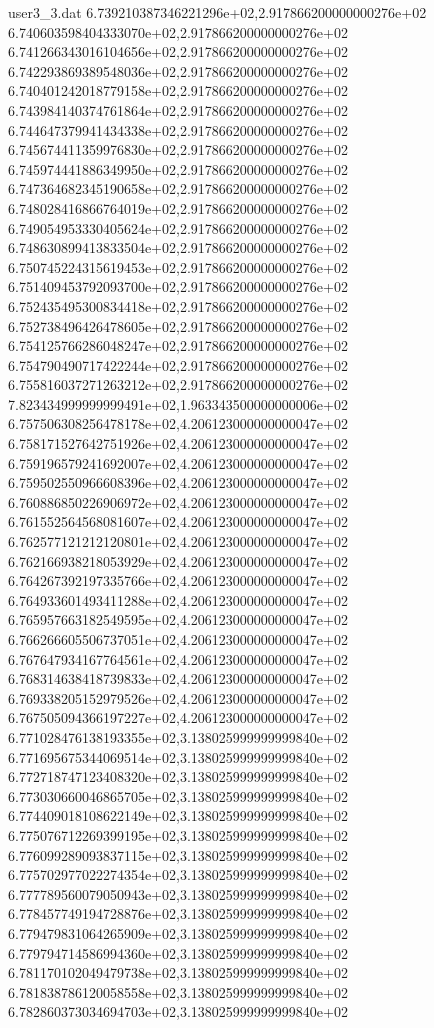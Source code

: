 \begin{filecontents}{user3_3.dat}
6.739210387346221296e+02,2.917866200000000276e+02
6.740603598404333070e+02,2.917866200000000276e+02
6.741266343016104656e+02,2.917866200000000276e+02
6.742293869389548036e+02,2.917866200000000276e+02
6.740401242018779158e+02,2.917866200000000276e+02
6.743984140374761864e+02,2.917866200000000276e+02
6.744647379941434338e+02,2.917866200000000276e+02
6.745674411359976830e+02,2.917866200000000276e+02
6.745974441886349950e+02,2.917866200000000276e+02
6.747364682345190658e+02,2.917866200000000276e+02
6.748028416866764019e+02,2.917866200000000276e+02
6.749054953330405624e+02,2.917866200000000276e+02
6.748630899413833504e+02,2.917866200000000276e+02
6.750745224315619453e+02,2.917866200000000276e+02
6.751409453792093700e+02,2.917866200000000276e+02
6.752435495300834418e+02,2.917866200000000276e+02
6.752738496426478605e+02,2.917866200000000276e+02
6.754125766286048247e+02,2.917866200000000276e+02
6.754790490717422244e+02,2.917866200000000276e+02
6.755816037271263212e+02,2.917866200000000276e+02
7.823434999999999491e+02,1.963343500000000006e+02
6.757506308256478178e+02,4.206123000000000047e+02
6.758171527642751926e+02,4.206123000000000047e+02
6.759196579241692007e+02,4.206123000000000047e+02
6.759502550966608396e+02,4.206123000000000047e+02
6.760886850226906972e+02,4.206123000000000047e+02
6.761552564568081607e+02,4.206123000000000047e+02
6.762577121212120801e+02,4.206123000000000047e+02
6.762166938218053929e+02,4.206123000000000047e+02
6.764267392197335766e+02,4.206123000000000047e+02
6.764933601493411288e+02,4.206123000000000047e+02
6.765957663182549595e+02,4.206123000000000047e+02
6.766266605506737051e+02,4.206123000000000047e+02
6.767647934167764561e+02,4.206123000000000047e+02
6.768314638418739833e+02,4.206123000000000047e+02
6.769338205152979526e+02,4.206123000000000047e+02
6.767505094366197227e+02,4.206123000000000047e+02
6.771028476138193355e+02,3.138025999999999840e+02
6.771695675344069514e+02,3.138025999999999840e+02
6.772718747123408320e+02,3.138025999999999840e+02
6.773030660046865705e+02,3.138025999999999840e+02
6.774409018108622149e+02,3.138025999999999840e+02
6.775076712269399195e+02,3.138025999999999840e+02
6.776099289093837115e+02,3.138025999999999840e+02
6.775702977022274354e+02,3.138025999999999840e+02
6.777789560079050943e+02,3.138025999999999840e+02
6.778457749194728876e+02,3.138025999999999840e+02
6.779479831064265909e+02,3.138025999999999840e+02
6.779794714586994360e+02,3.138025999999999840e+02
6.781170102049479738e+02,3.138025999999999840e+02
6.781838786120058558e+02,3.138025999999999840e+02
6.782860373034694703e+02,3.138025999999999840e+02

\end{filecontents}
